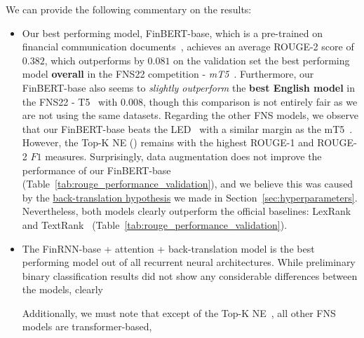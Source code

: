 We can provide the following commentary on the results:
\begin{itemize}
    \item Our best performing model, FinBERT-base, which is a pre-trained on financial communication documents~\cite{yang2020finbert},
        achieves an average ROUGE-2 score of $0.382$, which outperforms by $0.081$ on the validation set the best performing
        model \textbf{overall} in the FNS22 competition - \emph{mT5}~\cite{foroutan-etal-2022-multilingual}.
        Furthermore, our FinBERT-base also seems to \emph{slightly outperform} the \textbf{best English model} in the FNS22 - T5~\cite{el-haj-etal-2022-financial} with $0.008$,
        though this comparison is not entirely fair as we are not using the same datasets.
        Regarding the other FNS models, we observe that our FinBERT-base beats the LED~\cite{khanna-etal-2022-transformer} with a similar margin as the mT5~\cite{foroutan-etal-2022-multilingual}.
        However, the Top-K NE (\cite{shukla-etal-2022-dimsum}) remains with the highest ROUGE-1 and ROUGE-2 $F1$ measures.
        Surprisingly, data augmentation does not improve the performance of our FinBERT-base (Table~\ref{tab:rouge_performance_validation}), and we believe this was caused by
        the \hyperlink{data_augment_hypothesis}{back-translation hypothesis} we made in Section~\ref{sec:hyperparameters}.
        Nevertheless, both models clearly outperform the official baselines: LexRank~\cite{Erkan2004LexRankGC} and TextRank~\cite{mihalcea-tarau-2004-textrank} (Table~\ref{tab:rouge_performance_validation}).
    \item The FinRNN-base + attention + back-translation model is the best performing model out of all recurrent neural architectures.
    While preliminary binary classification results did not show any considerable differences between the models, clearly
    Additionally, we must note that except of the Top-K NE~\cite{shukla-etal-2022-dimsum}, all other FNS models are transformer-based,

\end{itemize}
